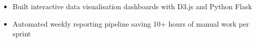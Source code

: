 

\begin{itemize}

  \item Built interactive data visualisation dashboards with D3.js and Python Flask

  \item Automated weekly reporting pipeline saving 10+ hours of manual work per sprint

\end{itemize}



